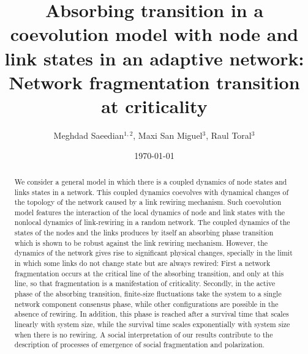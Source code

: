 \documentclass[aps,pre,notitlepage]{revtex4-1}
\begin{document}
\title{
Absorbing transition in a coevolution model with node and link states in an adaptive network: Network fragmentation transition at criticality}

\author{Meghdad Saeedian$^{1,2}$, Maxi San Miguel$^3$, Raul Toral$^3$}



\date{\today}
\begin{abstract}

We consider a general model in which there is a coupled dynamics of node states and links states in a network. This coupled dynamics coevolves with dynamical changes of the topology of the network caused by a link rewiring mechanism. Such coevolution model features the interaction of the local dynamics of node and link states with the nonlocal dynamics of link-rewiring in a random network. The coupled dynamics of the states of the nodes and the links produces by itself an absorbing phase transition which is shown to be robust against the link rewiring mechanism. However, the dynamics of the network gives rise to significant physical changes, specially in
the limit in which some links do not change state but are always rewired: First a network fragmentation occurs at the critical line of the absorbing transition, and only at this line, so that fragmentation is a manifestation of criticality. Secondly, in the active phase of the absorbing transition, finite-size fluctuations take the system to a single network component consensus phase, while other configurations are possible in the absence of rewiring. In addition, this phase is reached after a survival time that scales linearly with system size, while the survival time scales exponentially with system size when there is no rewiring. A social interpretation of our results contribute to the description of processes of emergence of social fragmentation and polarization.

\end{abstract}

\maketitle
\end{document}
